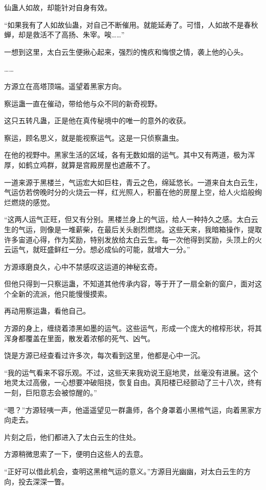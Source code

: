 \begin{this_body}
仙蛊人如故，却能针对自身有效。

“如果我有了人如故仙蛊，对自己不断催用。就能延寿了。可惜，人如故不是春秋蝉，却是救活不了高扬、朱宰。唉……”

一想到这里，太白云生便揪心起来，强烈的愧疚和悔恨之情，袭上他的心头。

……

方源立在高塔顶端。遥望着黑家方向。

察运蛊一直在催动，带给他与众不同的新奇视野。

这只五转凡蛊，正是他在真传秘境中的唯一的意外的收获。

察运，顾名思义，就是能视察运气。这是一只侦察蛊虫。

在他的视野中。黑家生活的区域，各有无数如烟的运气。其中又有两道，极为浑厚，如鹤立鸡群，就算是宫殿房屋也遮蔽不了。

一道来源于黑楼兰，气运宏大如巨柱，青云之色，绵延悠长。一道来自太白云生，气运仿若傍晚时分的火烧云一样，红光照人，积蓄在他的房屋上空，给人火焰般绚烂燃烧的感觉。

“这两人运气正旺，但又有分别。黑楼兰身上的气运，给人一种持久之感。太白云生的气运，则像是一堆薪柴，在最后关头剧烈燃烧。这些天来，我暗箱操作，提取许多宙道心得，作为奖励，特别发放给太白云生。每一次他得到奖励，头顶上的火云运气，就旺盛鲜红一分。想必成仙的可能，就增大一分。”

方源琢磨良久，心中不禁感叹这运道的神秘玄奇。

但他只得到一只察运蛊，不知道其他传承内容，等于开了一扇全新的窗户，面对这个全新的流派，他只能慢慢摸索。

再动用察运蛊，看他自己。

方源的身上，缠绕着漆黑如墨的运气。这些运气，形成一个庞大的棺椁形状，将其浑身都覆盖在里面，散发着浓郁的死气、凶气。

饶是方源已经查看过许多次，每次看到这里，他都是心中一沉。

“我的运气看来不容乐观。不过，这些天来我劝说王庭地灵，丝毫没有进展。这个地灵太过高傲，一心想要冲破阻挠，恢复自由。真阳楼已经颤动了三十八次，终有一刻，巨阳意志会被惊醒的。”

“嗯？”方源轻咦一声，他遥遥望见一群蛊师，各个身罩着小黑棺气运，向着黑家方向走去。

片刻之后，他们都进入了太白云生的住处。

方源稍微思索了一下，便明白这些人的去意。

“正好可以借此机会，查明这黑棺气运的意义。”方源目光幽幽，对太白云生的方向，投去深深一瞥。

\end{this_body}

